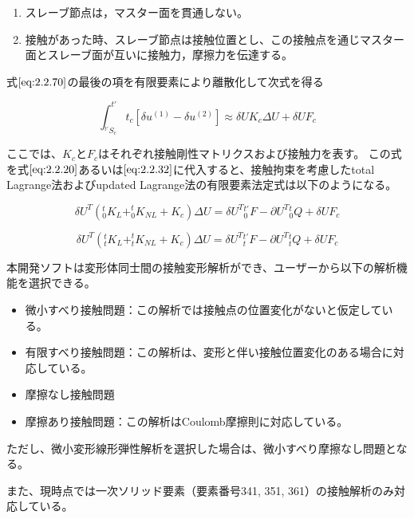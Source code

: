 \documentclass[a4paper,pandoc,ja=standard]{bxjsarticle}
\providecommand{\tightlist}{%
  \setlength{\itemsep}{0pt}\setlength{\parskip}{0pt}}
\begin{document}
\begin{enumerate}
\def\labelenumi{\arabic{enumi}.}
\tightlist
\item
  スレーブ節点は，マスター面を貫通しない。
\item
  接触があった時、スレーブ節点は接触位置とし、この接触点を通じマスター面とスレーブ面が互いに接触力，摩擦力を伝達する。
\end{enumerate}

式\(\eqref{eq:2.2.70}\)の最後の項を有限要素により離散化して次式を得る

\begin{equation}
\int^{t'}_{^{t'}S_{c}} t_c [\delta u^{(1)} - \delta u^{(2)}] \approx \delta UK_c \Delta U + \delta UF_c
\label{eq:2.2.71}
\end{equation}

ここでは、\(K_c\)と\(F_c\)はそれぞれ接触剛性マトリクスおよび接触力を表す。
この式を式\(\eqref{eq:2.2.20}\)あるいは\(\eqref{eq:2.2.32}\)に代入すると、接触拘束を考慮したtotal Lagrange法およびupdated Lagrange法の有限要素法定式は以下のようになる。

\begin{equation}
\delta U^T ( ^t_0 K_L + ^t_0 K_{NL} + K_c ) \Delta U = \delta U^T {_0^{t'} F} - \partial U^T {^t_0 Q} + \delta UF_c
\label{eq:2.2.72}
\end{equation}

\begin{equation}
\delta U^T (^t_t K_L + ^t_t K_{NL} + K_c ) \Delta U = \delta U^T {_{t} ^{t'} F} - \partial U^T {^t_t Q}+ \delta UF_c
\label{eq:2.2.73}
\end{equation}

本開発ソフトは変形体同士間の接触変形解析ができ、ユーザーから以下の解析機能を選択できる。

\begin{itemize}
\tightlist
\item
  微小すべり接触問題：この解析では接触点の位置変化がないと仮定している。
\item
  有限すべり接触問題：この解析は、変形と伴い接触位置変化のある場合に対応している。
\item
  摩擦なし接触問題
\item
  摩擦あり接触問題：この解析はCoulomb摩擦則に対応している。
\end{itemize}

ただし、微小変形線形弾性解析を選択した場合は、微小すべり摩擦なし問題となる。

また、現時点では一次ソリッド要素（要素番号341, 351, 361）の接触解析のみ対応している。
\end{document}
